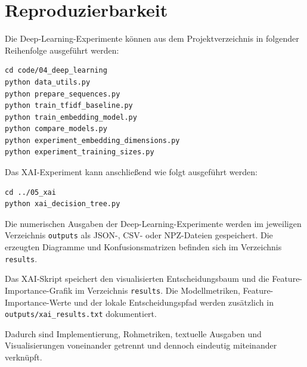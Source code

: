 \documentclass[12pt,a4paper]{article}
\begin{document}
\section{Reproduzierbarkeit}

Die Deep-Learning-Experimente können aus dem Projektverzeichnis in
folgender Reihenfolge ausgeführt werden:

\begin{verbatim}
cd code/04_deep_learning
python data_utils.py
python prepare_sequences.py
python train_tfidf_baseline.py
python train_embedding_model.py
python compare_models.py
python experiment_embedding_dimensions.py
python experiment_training_sizes.py
\end{verbatim}

Das XAI-Experiment kann anschließend wie folgt ausgeführt werden:

\begin{verbatim}
cd ../05_xai
python xai_decision_tree.py
\end{verbatim}

Die numerischen Ausgaben der Deep-Learning-Experimente werden im
jeweiligen Verzeichnis \texttt{outputs} als JSON-, CSV- oder
NPZ-Dateien gespeichert. Die erzeugten Diagramme und
Konfusionsmatrizen befinden sich im Verzeichnis \texttt{results}.

Das XAI-Skript speichert den visualisierten Entscheidungsbaum und die
Feature-Importance-Grafik im Verzeichnis \texttt{results}. Die
Modellmetriken, Feature-Importance-Werte und der lokale
Entscheidungspfad werden zusätzlich in
\texttt{outputs/xai\_results.txt} dokumentiert.

Dadurch sind Implementierung, Rohmetriken, textuelle Ausgaben und
Visualisierungen voneinander getrennt und dennoch eindeutig
miteinander verknüpft.
\end{document}
